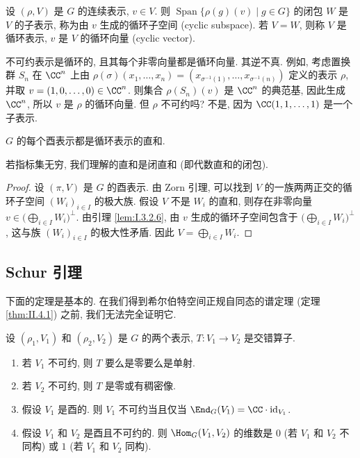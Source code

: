 \begin{definition}
\label{def:I.3.3.1}
设 $(\rho, V)$ 是 $G$ 的连续表示, $v \in V$. 则 $\operatorname{Span}\{\rho(g)(v) \mid g \in G\}$ 的闭包 $W$ 是 $V$ 的子表示, 称为由 $v$ 生成的循环子空间 (cyclic subspace).
若 $V = W$, 则称 $V$ 是循环表示, $v$ 是 $V$ 的循环向量 (cyclic vector).
\end{definition}

\begin{example}[循环表示的例]
\label{exa:I.3.3.2}
不可约表示是循环的, 且其每个非零向量都是循环向量.
其逆不真. 例如, 考虑置换群 $S_n$ 在 $\CC^n$ 上由 $\rho(\sigma)(x_1, \ldots, x_n) = (x_{\sigma^{-1}(1)}, \ldots, x_{\sigma^{-1}(n)})$ 定义的表示 $\rho$, 并取 $v = (1, 0, \ldots, 0) \in \CC^n$. 则集合 $\rho(S_n)(v)$ 是 $\CC^n$ 的典范基, 因此生成 $\CC^n$, 所以 $v$ 是 $\rho$ 的循环向量. 但 $\rho$ 不可约吗? 不是, 因为 $\CC(1, 1, \ldots, 1)$ 是一个子表示.
\end{example}

\begin{proposition}[循环分解]
\label{prop:I.3.3.3}
$G$ 的每个酉表示都是循环表示的直和.
\end{proposition}

若指标集无穷, 我们理解的直和是闭直和 (即代数直和的闭包).

\begin{proof}
设 $(\pi, V)$ 是 $G$ 的酉表示. 由 Zorn 引理, 可以找到 $V$ 的一族两两正交的循环子空间 $(W_i)_{i \in I}$ 的极大族. 假设 $V$ 不是 $W_i$ 的直和, 则存在非零向量 $v \in \bigl(\bigoplus_{i \in I} W_i\bigr)^{\perp}$. 由引理 \ref{lem:I.3.2.6}, 由 $v$ 生成的循环子空间包含于 $\bigl(\bigoplus_{i \in I} W_i\bigr)^{\perp}$, 这与族 $(W_i)_{i \in I}$ 的极大性矛盾. 因此 $V = \bigoplus_{i \in I} W_i$.
\end{proof}

\subsection{Schur 引理}

下面的定理是基本的. 在我们得到希尔伯特空间正规自同态的谱定理 (定理 \ref{thm:II.4.1}) 之前, 我们无法完全证明它.

\begin{theorem}
\label{thm:I.3.4.1}
设 $(\rho_1, V_1)$ 和 $(\rho_2, V_2)$ 是 $G$ 的两个表示, $T \colon V_1 \to V_2$ 是交错算子.

\begin{enumerate}
\item[(1)] 若 $V_1$ 不可约, 则 $T$ 要么是零要么是单射.
\item[(2)] 若 $V_2$ 不可约, 则 $T$ 是零或有稠密像.
\item[(3)] 假设 $V_1$ 是酉的. 则 $V_1$ 不可约当且仅当 $\End_G(V_1) = \CC \cdot \mathrm{id}_{V_1}$.
\item[(4)] 假设 $V_1$ 和 $V_2$ 是酉且不可约的. 则 $\Hom_G(V_1, V_2)$ 的维数是 $0$ (若 $V_1$ 和 $V_2$ 不同构) 或 $1$ (若 $V_1$ 和 $V_2$ 同构).
\end{enumerate}
\end{theorem}

